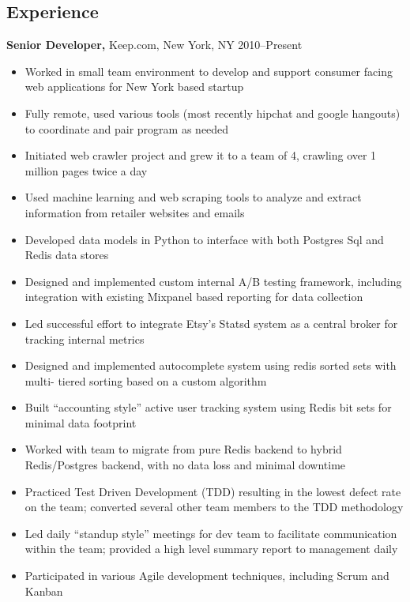 \documentclass[margin]{res}
\begin{document}
\begin{resume}
\section{Experience}
 {\bf Senior Developer,} Keep.com, New York, NY \hfill 2010--Present
\begin{itemize}
  \item Worked in small team environment to develop and support consumer facing web applications for New York based startup
  \item Fully remote, used various tools (most recently hipchat and google hangouts) to coordinate and pair program as needed
  \item Initiated web crawler project and grew it to a team of 4, crawling over 1 million pages twice a day
  \item Used machine learning and web scraping tools to analyze and extract information from retailer websites and emails
  \item Developed data models in Python to interface with both Postgres Sql and Redis data stores
  \item Designed and implemented custom internal A/B testing framework, including integration with existing Mixpanel based reporting for data collection
  \item Led successful effort to integrate Etsy's Statsd system as a central broker for tracking internal metrics
  \item Designed and implemented autocomplete system using redis sorted sets with multi- tiered sorting based on a custom algorithm
  \item Built “accounting style” active user tracking system using Redis bit sets for minimal data footprint
  \item Worked with team to migrate from pure Redis backend to hybrid Redis/Postgres backend, with no data loss and minimal downtime
  \item Practiced Test Driven Development (TDD) resulting in the lowest defect rate on the team; converted several other team members to the TDD methodology
  \item Led daily “standup style” meetings for dev team to facilitate communication within the team; provided a high level summary report to management daily
  \item Participated in various Agile development techniques, including Scrum and Kanban
\end{itemize}


\end{resume}
\end{document}
